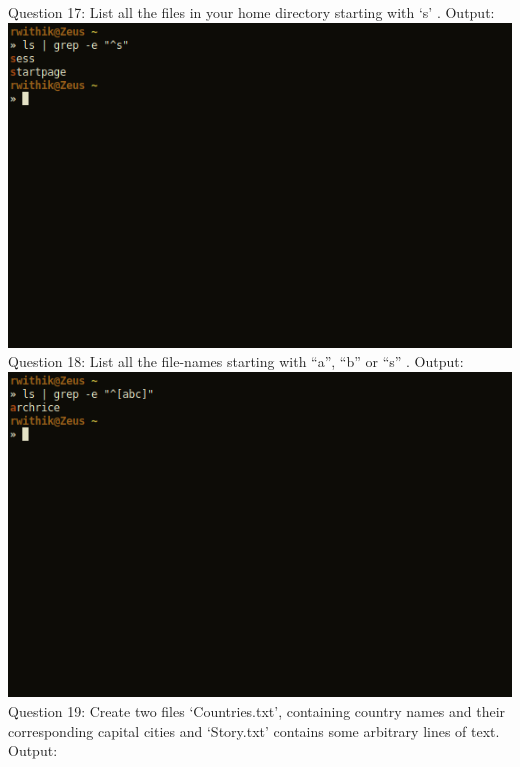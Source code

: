 \documentclass[10pt,a4paper,titlepage]{report}
\begin{document}
\newline
Question 17: List all the files in your home directory starting with ‘s’ .\newline
Output:\newline
\includegraphics[scale=.5]{../Images/Cycle2/17.png}\newline
\newline
Question 18: List all the file-names starting with “a”, “b” or “s” .\newline
Output:\newline
\includegraphics[scale=.5]{../Images/Cycle2/18.png}\pagebreak
\newline
Question 19: Create two files ‘Countries.txt’, containing country names and their corresponding capital cities and ‘Story.txt’ contains some arbitrary lines of text.\newline
Output:\newline
\end{document}
